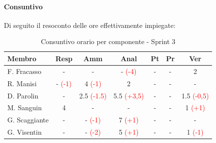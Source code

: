 \documentclass[a4paper,12pt]{article}
\begin{document}
\paragraph{Consuntivo}
Di seguito il resoconto delle ore effettivamente impiegate:

\begin{table}[H]
    \centering
    \renewcommand{\arraystretch}{1.3}
    \small
    \begin{tabularx}{\textwidth}{|l|C|C|C|C|C|C|}
        \hline
        \textbf{Membro} & \textbf{Resp} & \textbf{Amm} & \textbf{Anal} & \textbf{Pt} & \textbf{Pr} & \textbf{Ver} \\
        \hline
        F. Fracasso & - & - & - \textcolor{red}{(-4)} & - & - & 2 \\
        \hline
        R. Manisi & - \textcolor{red}{(-1)} & 4 \textcolor{red}{(-1)} & 2 & - & - & - \\
        \hline
        D. Parolin & - & 2.5 \textcolor{red}{(-1.5)} & 5.5 \textcolor{red}{(+3,5)} & - & - & 1.5 \textcolor{red}{(-0,5)}\\
        \hline
        M. Sanguin & 4 & - & - & - & - & 1 \textcolor{red}{(+1)} \\
        \hline
        G. Scaggiante & - & - \textcolor{red}{(-1)} & 7 \textcolor{red}{(+1)} & - & - & - \\
        \hline
        G. Visentin & - & - \textcolor{red}{(-2)} & 5 \textcolor{red}{(+1)} & - & - & 1 \textcolor{red}{(-1)} \\
        \hline
    \end{tabularx}
    \caption{Consuntivo orario per componente - Sprint 3}
    \label{tab:consuntivo_sprint3}
\end{table}
\end{document}
